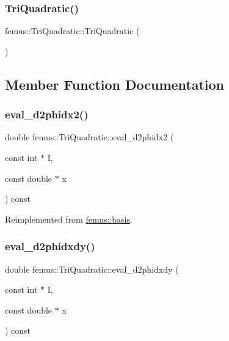 \subsubsection{\texorpdfstring{Tri\+Quadratic()}{TriQuadratic()}}
{\footnotesize\ttfamily femus\+::\+Tri\+Quadratic\+::\+Tri\+Quadratic (\begin{DoxyParamCaption}{ }\end{DoxyParamCaption})\hspace{0.3cm}{\ttfamily [inline]}}



\subsection{Member Function Documentation}
\mbox{\label{classfemus_1_1_tri_quadratic_a6fb9f8965f2bbe889a1c67c9ee9ddc01}} 
\subsubsection{\texorpdfstring{eval\+\_\+d2phidx2()}{eval\_d2phidx2()}}
{\footnotesize\ttfamily double femus\+::\+Tri\+Quadratic\+::eval\+\_\+d2phidx2 (\begin{DoxyParamCaption}\item[{const int $\ast$}]{I,  }\item[{const double $\ast$}]{x }\end{DoxyParamCaption}) const\hspace{0.3cm}{\ttfamily [virtual]}}



Reimplemented from \mbox{\hyperlink{classfemus_1_1basis_a0a9839e75d1c9c8302486fc072eed028}{femus\+::basis}}.

\mbox{\label{classfemus_1_1_tri_quadratic_a65fb374db41ce0bb2ade38e7e6af58a1}} 
\subsubsection{\texorpdfstring{eval\+\_\+d2phidxdy()}{eval\_d2phidxdy()}}
{\footnotesize\ttfamily double femus\+::\+Tri\+Quadratic\+::eval\+\_\+d2phidxdy (\begin{DoxyParamCaption}\item[{const int $\ast$}]{I,  }\item[{const double $\ast$}]{x }\end{DoxyParamCaption}) const\hspace{0.3cm}{\ttfamily [virtual]}}



